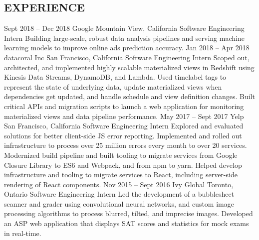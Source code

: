\documentclass{resume}
\begin{document}
  \begin{main}
    \vspace{0.2cm}%
    \section{EXPERIENCE}
      \begin{entrylist}
        \rightentry%
          {Sept 2018 -- Dec 2018}%
          {Google}%
          {Mountain View, California}%
          {Software Engineering Intern}%
          {\createlist%
            {%
              Building large-scale, robust data analysis pipelines and serving machine learning %
              models to improve online ads prediction accuracy. %
            }%
          }
        \rightentry%
          {Jan 2018 -- Apr 2018}%
          {datacoral Inc}%
          {San Francisco, California}%
          {Software Engineering Intern}%
          {\createlist%
            {%
              Scoped out, architected, and implemented highly scalable materialized views in %
              Redshift using Kinesis Data Streams, DynamoDB, and Lambda. %
            }%
            {%
              Used timelabel tags to represent the state of underlying data, update materialized %
              views when dependencies get updated, and handle schedule and view definition %
              changes. %
            }%
            {%
              Built critical APIs and migration scripts to launch a web application for monitoring %
              materialized views and data pipeline performance. %
            }%
          }
        \rightentry%
          {May 2017 -- Sept 2017}%
          {Yelp}%
          {San Francisco, California}%
          {Software Engineering Intern}%
          {\createlist%
            {%
              Explored and evaluated solutions for better client-side JS error reporting. %
            }%
            {%
              Implemented and rolled out infrastructure to process over 25 million errors every %
              month to over 20 services. %
            }%
            {%
              Modernized build pipeline and built tooling to migrate services from Google Closure %
              Library to ES6 and Webpack, and from npm to yarn. %
            }%
            {%
              Helped develop infrastructure and tooling to migrate services to React, including %
              server-side rendering of React components. %
            }%
          }
        \rightentry%
          {Nov 2015 -- Sept 2016}%
          {Ivy Global}%
          {Toronto, Ontario}%
          {Software Engineering Intern}%
          {\createlist%
            {%
              Led the development of a bubblesheet scanner and grader using convolutional neural %
              networks, and custom image processing algorithms to process blurred, tilted, and %
              imprecise images. %
            }%
            {%
              Developed an ASP web application that displays SAT scores and statistics for mock %
              exams in real-time. %
            }%
          }
      \end{entrylist}

\end{main}
\end{document}
